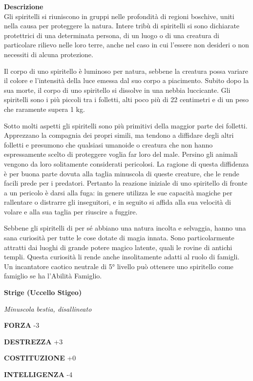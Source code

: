 \begin{multicols}{2}
\textbf{Descrizione}\\
Gli spiritelli si riuniscono in gruppi nelle profondità di regioni boschive, uniti nella causa per proteggere la natura. Intere tribù di spiritelli si sono dichiarate protettrici di una determinata persona, di un luogo o di una creatura di particolare rilievo nelle loro terre, anche nel caso in cui l'essere non desideri o non necessiti di alcuna protezione.

Il corpo di uno spiritello è luminoso per natura, sebbene la creatura possa variare il colore e l'intensità della luce emessa dal suo corpo a piacimento. Subito dopo la sua morte, il corpo di uno spiritello si dissolve in una nebbia luccicante. Gli spiritelli sono i più piccoli tra i folletti, alti poco più di 22 centimetri e di un peso che raramente supera 1 kg.

Sotto molti aspetti gli spiritelli sono più primitivi della maggior parte dei folletti. Apprezzano la compagnia dei propri simili, ma tendono a diffidare degli altri folletti e presumono che qualsiasi umanoide o creatura che non hanno espressamente scelto di proteggere voglia far loro del male. Persino gli animali vengono da loro solitamente considerati pericolosi. La ragione di questa diffidenza è per buona parte dovuta alla taglia minuscola di queste creature, che le rende facili prede per i predatori. Pertanto la reazione iniziale di uno spiritello di fronte a un pericolo è darsi alla fuga: in genere utilizza le sue capacità magiche per rallentare o distrarre gli inseguitori, e in seguito si affida alla sua velocità di volare e alla sua taglia per riuscire a fuggire.

Sebbene gli spiritelli di per sé abbiano una natura incolta e selvaggia, hanno una sana curiosità per tutte le cose dotate di magia innata. Sono particolarmente attratti dai luoghi di grande potere magico latente, quali le rovine di antichi templi. Questa curiosità li rende anche insolitamente adatti al ruolo di famigli. Un incantatore caotico neutrale di 5° livello può ottenere uno spiritello come famiglio se ha l'Abilità Famiglio.


\medskip{}\textbf{Strige (Uccello Stigeo)}

\textit{Minuscola bestia, disallineato}

\textbf{FORZA} -3

\textbf{DESTREZZA} +3

\textbf{COSTITUZIONE} +0

\textbf{INTELLIGENZA} -4


\end{multicols}
